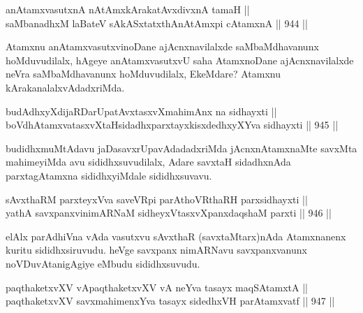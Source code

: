 \begin{shl}
anAtamxvasutxnA nA\s \s tAmx\s kArakatAvxdivxnA tamaH || \\
saMbanadhxM laBateV sAkASxtatxthA\s nAtAmx\s pi cA\s \s tamxnA \hfill || 944 ||  
\end{shl}

\begin{artha}
Atamxnu anAtamxvasutxvinoDane ajAcnxnavilalxde saMbaMdhavanunx hoMduvudilalx, hAgeye anAtamxvasutxvU saha AtamxnoDane ajAcnxnavilalxde neVra saMbaMdhavanunx hoMduvudilalx, EkeMdare? Atamxnu kArakanalalxvAdadxriMda.
\end{artha}


\begin{shl}
\footnotemark[1]budAdhxyXdijaRDarUpatAvxtasxvXmahimAnx na sidhayxti || \\
boVdhAtamxvatasxvXtaHsidadhxparxtayxkisxdedhxyXYva sidhayxti \hfill || 945 ||  
\end{shl}

\begin{artha}
budidhxmuMtAdavu jaDasavxrUpavAdadadxriMda jAcnxnAtamxnaMte savxMta mahimeyiMda avu sididhxsuvudilalx, Adare savxtaH sidadhxnAda parxtagAtamxna sididhxyiMdale sididhxsuvavu.
\end{artha}


\begin{shl}
sAvxthaRM parxteyxVva saveVR\s pi parAthoVR\s thaRH parxsidhayxti || \\
yathA savxpanxvinimARNaM sidheyxVtasxvXpanxdaqshaM parxti \hfill || 946 ||  
\end{shl}

\begin{artha}
elAlx parAdhiVna vAda vasutxvu sAvxthaR (savxtaMtarx)nAda Atamxnanenx kuritu sididhxsiruvudu. heVge savxpanx nimARNavu savxpanxvanunx noVDuvAtanigAgiye eMbudu sididhxsuvudu.
\end{artha}


\begin{shl}
paqthaketxvXV vA\s paqthaketxvXV vA neYva tasayx maqSAtamxtA || \\
paqthaketxvXV savxmahimenxYva tasayx sidedhxVH parAtamxvatf \hfill || 947 ||  
\end{shl}

